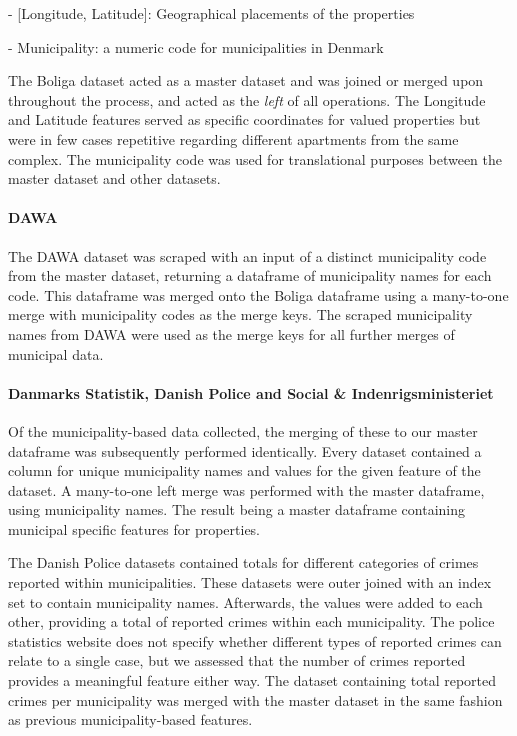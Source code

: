 \documentclass[12pt,a4paper]{article}
\begin{document}
-	[Longitude, Latitude]: Geographical placements of the properties

-	Municipality: a numeric code for municipalities in Denmark

The Boliga dataset acted as a master dataset and was joined or merged upon throughout the process, and acted as the \textit{left} of all operations. The Longitude and Latitude features served as specific coordinates for valued properties but were in few cases repetitive regarding different apartments from the same complex. The municipality code was used for translational purposes between the master dataset and other datasets.  

\paragraph{DAWA\newline}
The DAWA dataset was scraped with an input of a distinct municipality code from the master dataset, returning a dataframe of municipality names for each code. This dataframe was merged onto the Boliga dataframe using a many-to-one merge with municipality codes as the merge keys. The scraped municipality names from DAWA were used as the merge keys for all further merges of municipal data. 

\paragraph{Danmarks Statistik, Danish Police and Social \& Indenrigsministeriet\newline}
Of the municipality-based data collected, the merging of these to our master dataframe was subsequently performed identically. Every dataset contained a column for unique municipality names and values for the given feature of the dataset. A many-to-one left merge was performed with the master dataframe, using municipality names. The result being a master dataframe containing municipal specific features for properties. 

The Danish Police datasets contained totals for different categories of crimes reported within municipalities. These datasets were outer joined with an index set to contain municipality names. Afterwards, the values were added to each other, providing a total of reported crimes within each municipality. The police statistics website does not specify whether different types of reported crimes can relate to a single case, but we assessed that the number of crimes reported provides a meaningful feature either way. The dataset containing total reported crimes per municipality was merged with the master dataset in the same fashion as previous municipality-based features. 
\end{document}
